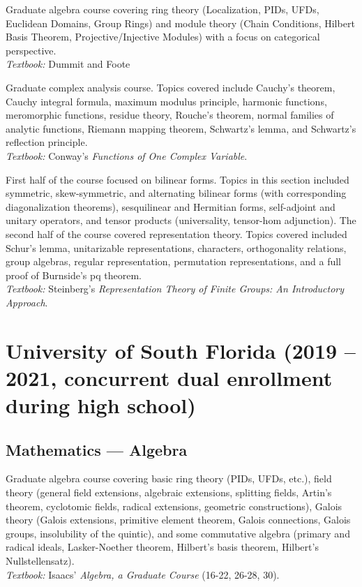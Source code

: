 \documentclass[11pt,letterpaper,sans]{moderncv}
\begin{document}
%
  {Graduate algebra course covering ring theory (Localization, PIDs, UFDs, Euclidean Domains, Group Rings) and module theory (Chain Conditions, Hilbert Basis Theorem, Projective/Injective Modules) with a focus on categorical perspective.   \\ \emph{Textbook: }Dummit and Foote}

%
  {Graduate complex analysis course. Topics covered include Cauchy’s theorem, Cauchy integral formula, maximum modulus principle, harmonic functions, meromorphic functions, residue theory, Rouche's theorem, normal families of analytic functions, Riemann mapping theorem, Schwartz's lemma, and Schwartz's reflection principle. \\ \emph{Textbook: }Conway's \emph{Functions of One Complex Variable}.}

%
  {First half of the course focused on bilinear forms. Topics in this section included symmetric, skew-symmetric, and alternating bilinear forms (with corresponding diagonalization theorems), sesquilinear and Hermitian forms, self-adjoint and unitary operators, and tensor products (universality, tensor-hom adjunction). The second half of the course covered representation theory. Topics covered included Schur's lemma, unitarizable representations, characters, orthogonality relations, group algebras, regular representation, permutation representations, and a full proof of Burnside's pq theorem. \\ \emph{Textbook: }Steinberg's \emph{Representation Theory of Finite Groups: An Introductory Approach}.}


\section{University of South Florida (2019 -- 2021, concurrent dual enrollment during high school)}


\subsection{Mathematics --- Algebra}

%
  {Graduate algebra course covering basic ring theory (PIDs, UFDs, etc.), field theory (general field extensions, algebraic extensions, splitting fields, Artin's theorem, cyclotomic fields, radical extensions, geometric constructions), Galois theory (Galois extensions, primitive element theorem, Galois connections, Galois groups, insolubility of the quintic), and some commutative algebra (primary and radical ideals, Lasker-Noether theorem, Hilbert's basis theorem, Hilbert's Nullstellensatz).  \\ \emph{Textbook: }Isaacs' \emph{Algebra, a Graduate Course} (16-22, 26-28, 30).}
\end{document}
